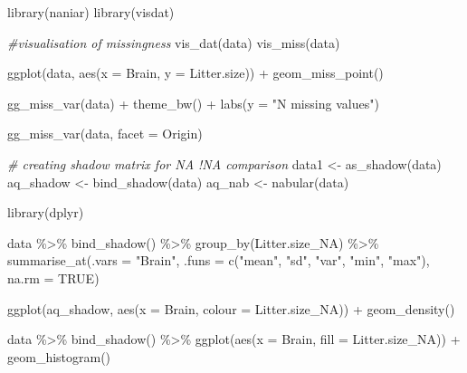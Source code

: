\documentclass[
]{article}
\newenvironment{Shaded}{\begin{snugshade}}{\end{snugshade}}
\newcommand{\AttributeTok}[1]{\textcolor[rgb]{0.77,0.63,0.00}{#1}}
\newcommand{\CommentTok}[1]{\textcolor[rgb]{0.56,0.35,0.01}{\textit{#1}}}
\newcommand{\ConstantTok}[1]{\textcolor[rgb]{0.00,0.00,0.00}{#1}}
\newcommand{\FunctionTok}[1]{\textcolor[rgb]{0.00,0.00,0.00}{#1}}
\newcommand{\NormalTok}[1]{#1}
\newcommand{\OtherTok}[1]{\textcolor[rgb]{0.56,0.35,0.01}{#1}}
\newcommand{\SpecialCharTok}[1]{\textcolor[rgb]{0.00,0.00,0.00}{#1}}
\newcommand{\StringTok}[1]{\textcolor[rgb]{0.31,0.60,0.02}{#1}}
\begin{document}
\begin{Shaded}
\begin{Highlighting}[]
\FunctionTok{library}\NormalTok{(naniar)}
\FunctionTok{library}\NormalTok{(visdat)}

\CommentTok{\#visualisation of missingness}
\FunctionTok{vis\_dat}\NormalTok{(data)}
\FunctionTok{vis\_miss}\NormalTok{(data)}


\FunctionTok{ggplot}\NormalTok{(data, }
       \FunctionTok{aes}\NormalTok{(}\AttributeTok{x =}\NormalTok{ Brain, }
           \AttributeTok{y =}\NormalTok{ Litter.size)) }\SpecialCharTok{+} 
  \FunctionTok{geom\_miss\_point}\NormalTok{()}

\FunctionTok{gg\_miss\_var}\NormalTok{(data) }\SpecialCharTok{+} \FunctionTok{theme\_bw}\NormalTok{() }\SpecialCharTok{+} \FunctionTok{labs}\NormalTok{(}\AttributeTok{y =} \StringTok{"N missing values"}\NormalTok{)}

\FunctionTok{gg\_miss\_var}\NormalTok{(data, }\AttributeTok{facet =}\NormalTok{ Origin)}

\CommentTok{\# creating shadow matrix for NA !NA comparison}
\NormalTok{data1 }\OtherTok{\textless{}{-}} \FunctionTok{as\_shadow}\NormalTok{(data)}
\NormalTok{aq\_shadow }\OtherTok{\textless{}{-}} \FunctionTok{bind\_shadow}\NormalTok{(data)}
\NormalTok{aq\_nab }\OtherTok{\textless{}{-}} \FunctionTok{nabular}\NormalTok{(data)}

\FunctionTok{library}\NormalTok{(dplyr)}

\NormalTok{data }\SpecialCharTok{\%\textgreater{}\%}
  \FunctionTok{bind\_shadow}\NormalTok{() }\SpecialCharTok{\%\textgreater{}\%}
  \FunctionTok{group\_by}\NormalTok{(Litter.size\_NA) }\SpecialCharTok{\%\textgreater{}\%}
  \FunctionTok{summarise\_at}\NormalTok{(}\AttributeTok{.vars =} \StringTok{"Brain"}\NormalTok{,}
               \AttributeTok{.funs =} \FunctionTok{c}\NormalTok{(}\StringTok{"mean"}\NormalTok{, }\StringTok{"sd"}\NormalTok{, }\StringTok{"var"}\NormalTok{, }\StringTok{"min"}\NormalTok{, }\StringTok{"max"}\NormalTok{),}
               \AttributeTok{na.rm =} \ConstantTok{TRUE}\NormalTok{)}


\FunctionTok{ggplot}\NormalTok{(aq\_shadow,}
       \FunctionTok{aes}\NormalTok{(}\AttributeTok{x =}\NormalTok{ Brain,}
           \AttributeTok{colour =}\NormalTok{ Litter.size\_NA)) }\SpecialCharTok{+} 
  \FunctionTok{geom\_density}\NormalTok{()}

\NormalTok{  data }\SpecialCharTok{\%\textgreater{}\%}
    \FunctionTok{bind\_shadow}\NormalTok{() }\SpecialCharTok{\%\textgreater{}\%}
    \FunctionTok{ggplot}\NormalTok{(}\FunctionTok{aes}\NormalTok{(}\AttributeTok{x =}\NormalTok{ Brain,}
               \AttributeTok{fill =}\NormalTok{ Litter.size\_NA)) }\SpecialCharTok{+}
        \FunctionTok{geom\_histogram}\NormalTok{()}
  

\end{Highlighting}
\end{Shaded}
\end{document}
